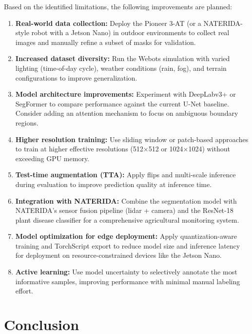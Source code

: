 \documentclass[12pt,a4paper]{article}
\begin{document}
Based on the identified limitations, the following improvements are planned:

\begin{enumerate}[noitemsep]
    \item \textbf{Real-world data collection:} Deploy the Pioneer 3-AT (or a NATERIDA-style robot with a Jetson Nano) in outdoor environments to collect real images and manually refine a subset of masks for validation.

    \item \textbf{Increased dataset diversity:} Run the Webots simulation with varied lighting (time-of-day cycle), weather conditions (rain, fog), and terrain configurations to improve generalization.

    \item \textbf{Model architecture improvements:} Experiment with DeepLabv3+ or SegFormer to compare performance against the current U-Net baseline. Consider adding an attention mechanism to focus on ambiguous boundary regions.

    \item \textbf{Higher resolution training:} Use sliding window or patch-based approaches to train at higher effective resolutions (512$\times$512 or 1024$\times$1024) without exceeding GPU memory.

    \item \textbf{Test-time augmentation (TTA):} Apply flips and multi-scale inference during evaluation to improve prediction quality at inference time.

    \item \textbf{Integration with NATERIDA:} Combine the segmentation model with NATERIDA's sensor fusion pipeline (lidar + camera) and the ResNet-18 plant disease classifier for a comprehensive agricultural monitoring system.

    \item \textbf{Model optimization for edge deployment:} Apply quantization-aware training and TorchScript export to reduce model size and inference latency for deployment on resource-constrained devices like the Jetson Nano.

    \item \textbf{Active learning:} Use model uncertainty to selectively annotate the most informative samples, improving performance with minimal manual labeling effort.
\end{enumerate}

\section{Conclusion}
\label{sec:conclusion}
\end{document}

